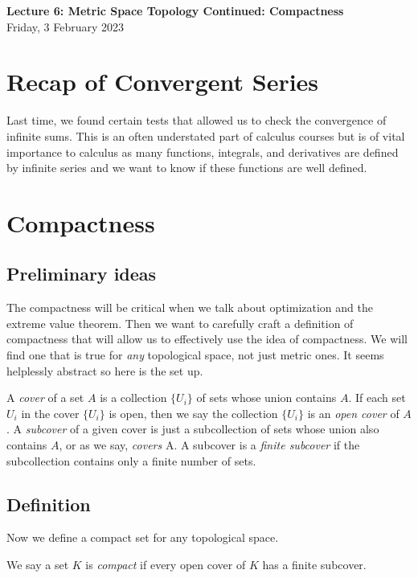\documentclass[11pt]{article}
\theoremstyle{definition}
\begin{document}
\thispagestyle{empty}

\begin{center}
{\LARGE \bf Lecture 6: Metric Space Topology Continued: Compactness}\\
{\large Friday, 3 February 2023}\\

\end{center}
\section{Recap of Convergent Series}

Last time, we found certain tests that allowed us to check the convergence of infinite sums. This is an often understated part of calculus courses but is of vital importance to calculus as many functions, integrals, and derivatives are defined by infinite series and we want to know if these functions are well defined.

\section{Compactness}
\subsection{Preliminary ideas}
The compactness will be critical when we talk about optimization and the extreme value theorem. Then we want to carefully craft a definition of compactness that will allow us to effectively use the idea of compactness. We will find one that is true for \textit{any} topological space, not just metric ones. It seems helplessly abstract so here is the set up.

 A \textit{cover} of a set $A$ is a collection $\{U_i\}$ of sets whose union contains $A$. If each set $U_i$ in the cover $\{U_i\}$ is open, then we say the collection $\{U_i\}$ is an \textit{open cover} of $A$. A \textit{subcover} of a given cover is just a subcollection of sets whose union also contains $A$, or as we say, \textit{covers} A. A subcover is a \textit{finite subcover} if the subcollection contains only a finite number of sets.

\subsection{Definition}

Now we define a compact set for any topological space.

 We say a set $K$ is \textit{compact} if every open cover of $K$ has a finite subcover.
\end{document}
